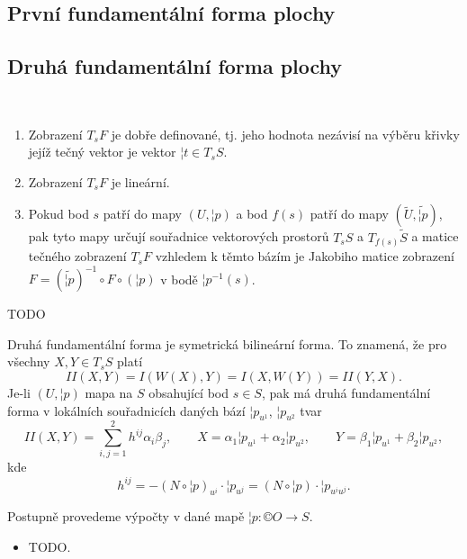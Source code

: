 \documentclass[12pt]{article}                   %
\begin{document}
    \subsection{První fundamentální forma plochy}
    \subsection{Druhá fundamentální forma plochy}
        \begin{lemma}
            \ 

            \begin{enumerate}
                \item Zobrazení $T_sF$ je dobře definované, tj. jeho hodnota nezávisí na výběru křivky jejíž tečný vektor je vektor $¦t \in T_sS$.
                \item Zobrazení $T_sF$ je lineární.
                \item Pokud bod $s$ patří do mapy $(U, ¦p)$ a bod $f(s)$ patří do mapy $(\tilde{U}, \tilde{¦p})$, pak tyto mapy určují souřadnice vektorových prostorů $T_sS$ a $T_{f(s)}\tilde{S}$ a matice tečného zobrazení $T_sF$ vzhledem k těmto bázím je Jakobiho matice zobrazení $F = (\tilde{¦p})^{-1}\circ F \circ (¦p)$ v bodě $¦p^{-1}(s)$.
            \end{enumerate}

            \begin{dukazin}
                TODO
            \end{dukazin}
        \end{lemma}

        \begin{lemma}
            Druhá fundamentální forma je symetrická bilineární forma. To znamená, že pro všechny $X, Y \in T_sS$ platí
            $$ II(X, Y) = I(W(X), Y) = I(X, W(Y)) = II(Y, X). $$
            Je-li $(U, ¦p)$ mapa na $S$ obsahující bod $s \in S$, pak má druhá fundamentální forma v lokálních souřadnicích daných bází $¦p_{u^1}$, $¦p_{u^2}$ tvar
            $$ II(X, Y) = \sum_{i, j = 1}^2 h^{ij}\alpha_i\beta_j, \qquad X = \alpha_1¦p_{u^1} + \alpha_2¦p_{u^2}, \qquad Y = \beta_1¦p_{u^1} + \beta_2¦p_{u^2}, $$
            kde
            $$ h^{ij} = -(N \circ ¦p)_{u^i}·¦p_{u^j} = (N \circ ¦p)·¦p_{u^iu^j}. $$

            \begin{dukazin}
                Postupně provedeme výpočty v dané mapě $¦p: ©O \rightarrow S$.

                \begin{itemize}
                    \item TODO.
                \end{itemize}
            \end{dukazin}
        \end{lemma}
\end{document}
